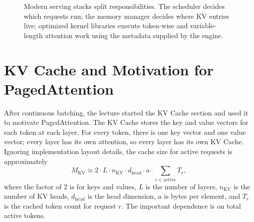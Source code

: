 \documentclass[twoside]{article}
\newcommand{\kv}{\mathrm{KV}}
\begin{document}
\begin{figure}[H]
\centering
{}
\caption{Modern serving stacks split responsibilities.  The scheduler decides which requests run; the memory manager decides where KV entries live; optimized kernel libraries execute token-wise and variable-length attention work using the metadata supplied by the engine.}
\label{fig:serving-stack}
\end{figure}

\section{KV Cache and Motivation for PagedAttention}

After continuous batching, the lecture started the KV Cache section and used it to motivate PagedAttention.  The KV Cache stores the key and value vectors for each token at each layer.  For every token, there is one key vector and one value vector; every layer has its own attention, so every layer has its own KV Cache.  Ignoring implementation layout details, the cache size for active requests is approximately
\[
  M_{\kv}
  \approx
  2 \cdot L \cdot n_{\kv} \cdot d_{\mathrm{head}} \cdot a
  \cdot
  \sum_{r \in \mathrm{active}} T_r,
\]
where the factor of 2 is for keys and values, \(L\) is the number of layers, \(n_{\kv}\) is the number of KV heads, \(d_{\mathrm{head}}\) is the head dimension, \(a\) is bytes per element, and \(T_r\) is the cached token count for request \(r\).  The important dependence is on total active tokens.
\end{document}
